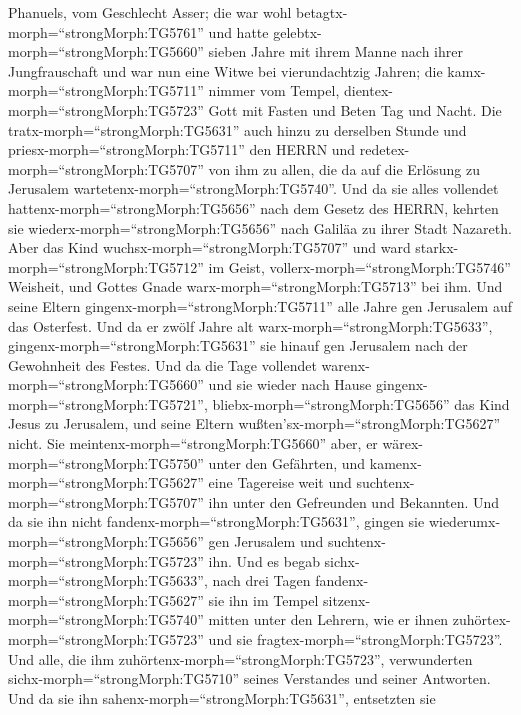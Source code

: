 Phanuels, vom Geschlecht Asser; die war wohl
betagtx-morph=``strongMorph:TG5761'' und hatte
gelebtx-morph=``strongMorph:TG5660'' sieben Jahre mit ihrem Manne nach
ihrer Jungfrauschaft  und war nun eine Witwe bei
vierundachtzig Jahren; die kamx-morph=``strongMorph:TG5711'' nimmer vom
Tempel, dientex-morph=``strongMorph:TG5723'' Gott mit Fasten und Beten
Tag und Nacht.  Die tratx-morph=``strongMorph:TG5631'' auch
hinzu zu derselben Stunde und priesx-morph=``strongMorph:TG5711'' den
HERRN und redetex-morph=``strongMorph:TG5707'' von ihm zu allen, die da
auf die Erlösung zu Jerusalem wartetenx-morph=``strongMorph:TG5740''.
 Und da sie alles vollendet
hattenx-morph=``strongMorph:TG5656'' nach dem Gesetz des HERRN, kehrten
sie wiederx-morph=``strongMorph:TG5656'' nach Galiläa zu ihrer Stadt
Nazareth.  Aber das Kind
wuchsx-morph=``strongMorph:TG5707'' und ward
starkx-morph=``strongMorph:TG5712'' im Geist,
vollerx-morph=``strongMorph:TG5746'' Weisheit, und Gottes Gnade
warx-morph=``strongMorph:TG5713'' bei ihm.  Und seine
Eltern gingenx-morph=``strongMorph:TG5711'' alle Jahre gen Jerusalem auf
das Osterfest.  Und da er zwölf Jahre alt
warx-morph=``strongMorph:TG5633'', gingenx-morph=``strongMorph:TG5631''
sie hinauf gen Jerusalem nach der Gewohnheit des Festes. 
Und da die Tage vollendet warenx-morph=``strongMorph:TG5660'' und sie
wieder nach Hause gingenx-morph=``strongMorph:TG5721'',
bliebx-morph=``strongMorph:TG5656'' das Kind Jesus zu Jerusalem, und
seine Eltern wußten'sx-morph=``strongMorph:TG5627'' nicht. 
Sie meintenx-morph=``strongMorph:TG5660'' aber, er
wärex-morph=``strongMorph:TG5750'' unter den Gefährten, und
kamenx-morph=``strongMorph:TG5627'' eine Tagereise weit und
suchtenx-morph=``strongMorph:TG5707'' ihn unter den Gefreunden und
Bekannten.  Und da sie ihn nicht
fandenx-morph=``strongMorph:TG5631'', gingen sie
wiederumx-morph=``strongMorph:TG5656'' gen Jerusalem und
suchtenx-morph=``strongMorph:TG5723'' ihn.  Und es begab
sichx-morph=``strongMorph:TG5633'', nach drei Tagen
fandenx-morph=``strongMorph:TG5627'' sie ihn im Tempel
sitzenx-morph=``strongMorph:TG5740'' mitten unter den Lehrern, wie er
ihnen zuhörtex-morph=``strongMorph:TG5723'' und sie
fragtex-morph=``strongMorph:TG5723''.  Und alle, die ihm
zuhörtenx-morph=``strongMorph:TG5723'', verwunderten
sichx-morph=``strongMorph:TG5710'' seines Verstandes und seiner
Antworten.  Und da sie ihn
sahenx-morph=``strongMorph:TG5631'', entsetzten sie

